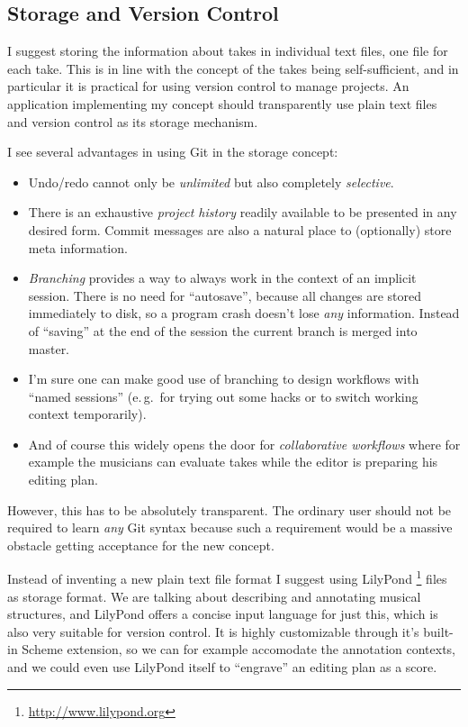 \documentclass[11pt,a4paper]{article}
\begin{document}
\subsection{Storage and Version Control}

I suggest storing the information about takes in individual text files, one file for each take.
This is in line with the concept of the takes being self-sufficient, and in particular it is practical for using version control to manage projects.
An application implementing my concept should transparently use plain text files and version control as its storage mechanism.

I see several advantages in using Git in the storage concept:
\begin{itemize}
\item Undo/redo cannot only be \emph{unlimited} but also completely \emph{selective}.
\item There is an exhaustive \emph{project history} readily available to be presented in any desired form.
Commit messages are also a natural place to (optionally) store meta information.
\item \emph{Branching} provides a way to always work in the context of an implicit session.
There is no need for “autosave”, because all changes are stored immediately to disk, so a program crash doesn't lose \emph{any} information.
Instead of “saving” at the end of the session the current branch is merged into master.
\item I'm sure one can make good use of branching to design workflows with “named sessions” (e.\,g.\ for trying out some hacks or to switch working context temporarily).
\item And of course this widely opens the door for \emph{collaborative workflows} where for example the musicians can evaluate takes while the editor is preparing his editing plan.
\end{itemize}

However, this has to be absolutely transparent.
The ordinary user should not be required to learn \emph{any} Git syntax because such a requirement would be a massive obstacle getting acceptance for the new concept.

\medskip
Instead of inventing a new plain text file format I suggest using LilyPond%
\footnote{\url{http://www.lilypond.org}}
files as storage format.
We are talking about describing and annotating musical structures, and LilyPond offers a concise input language for just this, which is also very suitable for version control.
It is highly customizable through it's built-in Scheme extension, so we can for example accomodate the annotation contexts, and we could even use LilyPond itself to “engrave” an editing plan as a score.
\end{document}
